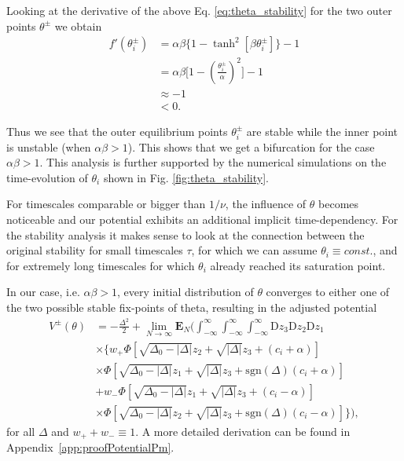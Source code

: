 \documentclass[reprint,amsmath,amssymb,aps]{revtex4-2}
\begin{document}
Looking at the derivative of the above Eq. \eqref{eq:theta_stability} for the two outer points $\theta^\pm$ we obtain
\begin{align*}
    f'(\theta_i^\pm)
    &=
    \alpha\beta \Big\{1-\tanh^2\left[\beta \theta_i^\pm\right] \Big\} - 1 \\
    &=
    \alpha\beta \Big[1- \left(\frac{\theta_i^\pm}{\alpha}\right)^2 \Big] - 1 \\
    &\approx -1 \\
    &< 0.
\end{align*}

Thus we see that the outer equilibrium points $\theta_i^\pm$ are stable while the inner point is unstable (when $\alpha\beta>1$). This shows that we get a bifurcation for the case $\alpha\beta>1$.
This analysis is further supported by the numerical simulations on the time-evolution of $\theta_i$ shown in Fig. \ref{fig:theta_stability}.


For timescales comparable or bigger than $1/\nu$, the influence of $\theta$ becomes noticeable and our potential exhibits an additional implicit time-dependency. For the stability analysis it makes sense to look at the connection between the original stability for small timescales $\tau$, for which we can assume $\theta_i\equiv const.$, and for extremely long timescales for which $\theta_i$ already reached its saturation point.

In our case, i.e. $\alpha\beta>1$, every initial distribution of $\theta$ converges to either one of the two possible stable fix-points of theta, resulting in the adjusted potential
\begin{align}
\label{eq:pmpotential}
    V^\pm(\theta)
    &=
    -\frac{\Delta^2}{2}+ 
    \lim_{N\to\infty}\mathbf{E}_{N}\Bigg(
    \int_{-\infty}^{\infty}
    \int_{-\infty}^{\infty}
    \int_{-\infty}^{\infty}
    \mathrm{D}z_3
    \mathrm{D}z_2
    \mathrm{D}z_1 \\
    &\times
    \nonumber
    \Bigg\{
    w_+
    \Phi\left[ \sqrt{\Delta_0 - |\Delta|} z_2 + \sqrt{|\Delta|}z_3 + (c_i + \alpha) \right]
    \\
    &\times
    \nonumber
    \Phi\left[ \sqrt{\Delta_0 - |\Delta|} z_1 + \sqrt{|\Delta|}z_3 + \mathrm{sgn}(\Delta) (c_i + \alpha) \right]\\
    &
    \nonumber
    +
    w_-
    \Phi\left[ \sqrt{\Delta_0 - |\Delta|} z_1 + \sqrt{|\Delta|}z_3 + (c_i - \alpha) \right]
    \\
    &\times
    \nonumber
    \Phi\left[ \sqrt{\Delta_0 - |\Delta|} z_2 + \sqrt{|\Delta|}z_3 + \mathrm{sgn}(\Delta) (c_i - \alpha) \right]
    \Bigg\}
    \Bigg),
\end{align}
for all $\Delta$ and $w_++w_- \equiv 1$. A more detailed derivation can be found in Appendix~\ref{app:proofPotentialPm}.
\end{document}
